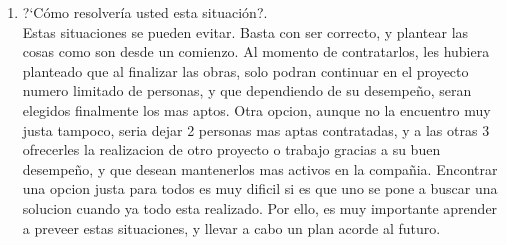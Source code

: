 \begin{itemize}
\begin{enumerate}
		\item ?`C\'omo resolver\'ia usted esta situaci\'on?.\\
	Estas situaciones se pueden evitar. Basta con ser correcto, y plantear las cosas como son desde un comienzo. Al momento de contratarlos, les hubiera planteado que al finalizar las obras, solo podran continuar en el proyecto numero limitado de personas, y que dependiendo de su desempe\~no, seran elegidos finalmente los mas aptos. Otra opcion, aunque no la encuentro muy justa tampoco, seria dejar 2 personas mas aptas contratadas, y a las otras 3 ofrecerles la realizacion de otro proyecto o trabajo gracias a su buen desempe\~no, y que desean mantenerlos mas activos en la compa\~nia. Encontrar una opcion justa para todos es muy dificil si es que uno se pone a buscar una solucion cuando ya todo esta realizado. Por ello, es muy importante aprender a preveer estas situaciones, y llevar a cabo un plan acorde al futuro.
	\end{enumerate}


\end{itemize}
